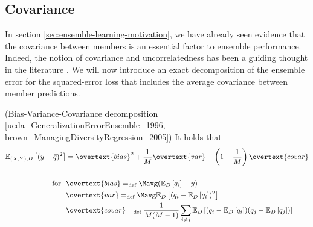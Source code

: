 \documentclass[../main.tex]{subfiles}
\begin{document}
\subsection{Covariance}
\label{sec:bias-variance-covariance}

In section \ref{sec:ensemble-learning-motivation}, we have already seen evidence that the covariance between members is an essential factor to ensemble performance. Indeed, the notion of covariance and uncorrelatedness has been a guiding thought in the literature \cite{didaci_DiversityClassifierEnsembles_2013, brown_ManagingDiversityRegression_2005, buschjager_GeneralizedNegativeCorrelation_2020}.
We will now introduce an exact decomposition of the ensemble error for the squared-error loss that includes the average covariance between member predictions.
\begin{theorem} (Bias-Variance-Covariance decomposition \ref{ueda_GeneralizationErrorEnsemble_1996, brown_ManagingDiversityRegression_2005})
  \label{thm:bias-variance-covariance}
It holds that
$$
\begin{align}
\mathbb{E}_{(X,Y),D}\left[ (y - \bar{q})^2 \right]  &= \overtext{bias}^2 + \frac{1}{M} \overtext{var} + \left( 1 - \frac{1}{M} \right) \overtext{covar} \\ \\ 
\text{for} ~ ~ & \overtext{bias} =_{\text{def}} \Mavg (\mathbb{E}_{D}\left[ q_{i}  \right] - y) \\
& \overtext{var} =_{\text{def}} \Mavg \mathbb{E}_{D}\left[ (q_{i} - \mathbb{E}_{D}\left[ q_{i} \right])^2  \right]  \\
& \overtext{covar} =_{\text{def}} \frac{1}{M(M-1)} \sum_{i \not= j} \mathbb{E}_{D}\left[ (q_{i} - \mathbb{E}_{D}\left[ q_{i} \right] ) (q_{j} - \mathbb{E}_{D}\left[ q_{j} \right] ) \right] 
\end{align}
$$
\end{theorem}
\end{document}
